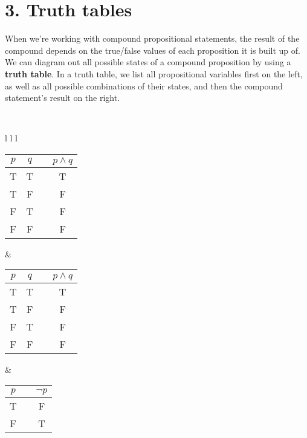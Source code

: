 \documentclass[a4paper,12pt]{book}
\begin{document}
    \newpage
    \section*{3. Truth tables}
        \begin{introNOHEAD}
            When we're working with compound propositional statements,
            the result of the compound depends on the true/false values
            of each proposition it is built up of.
            ~\\
            We can diagram out all possible states of a compound proposition
            by using a \textbf{truth table}. In a truth table, we list
            all propositional variables first on the left, as well as
            all possible combinations of their states, and then
            the compound statement's result on the right.

            ~\\

            \begin{tabular}{ l l l }

                \begin{tabular}{ | c | c | c | c | }
                    \hline
                    $p$ & $q$ & & $p \land q$ \\ \hline
                    T & T & & T \\ \hline
                    T & F & & F \\ \hline
                    F & T & & F \\ \hline
                    F & F & & F \\ \hline

                \end{tabular}
                &

                \begin{tabular}{ | c | c | c | c | }
                    \hline
                    $p$ & $q$ & & $p \land q$ \\ \hline
                    T & T & & T \\ \hline
                    T & F & & F \\ \hline
                    F & T & & F \\ \hline
                    F & F & & F \\ \hline

                \end{tabular}
                &

                \begin{tabular}{ | c | c | c | }
                    \hline
                    $p$ & & $\neg p$ \\ \hline
                    T & & F \\ \hline
                    F & & T \\ \hline

                \end{tabular}

            \end{tabular}
        \end{introNOHEAD}
\end{document}
